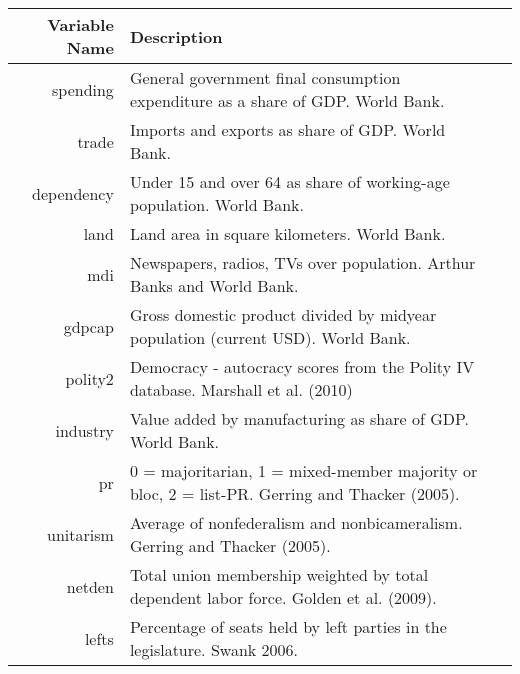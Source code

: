 
\begin{landscape}
\begin{table}[ht]
\begin{center}
\begin{tabular}{rll}
  \hline
 Variable Name & Description \\ 
  \hline
spending & General government final consumption expenditure as a share of GDP. World Bank.\\ 
trade & Imports and exports as share of GDP. World Bank.\\ 
dependency & Under 15 and over 64 as share of working-age population. World Bank. \\ 
land & Land area in square kilometers. World Bank. \\ 
mdi & Newspapers, radios, TVs over population. Arthur Banks and World Bank.\\ 
gdpcap & Gross domestic product divided by midyear population (current USD). World Bank. \\ 
polity2 & Democracy - autocracy scores from the Polity IV database. Marshall et al. (2010) \\ 
industry & Value added by manufacturing as share of GDP. World Bank.\\ 
pr & 0 = majoritarian, 1 = mixed-member majority or bloc, 2 = list-PR. Gerring and Thacker (2005). \\ 
unitarism & Average of nonfederalism and nonbicameralism. Gerring and Thacker (2005). \\ 
netden & Total union membership weighted by total dependent labor force. Golden et al. (2009). \\ 
lefts & Percentage of seats held by left parties in the legislature. Swank 2006. \\ 
   \hline
\end{tabular}
\end{center}
\end{table}
\end{landscape}
